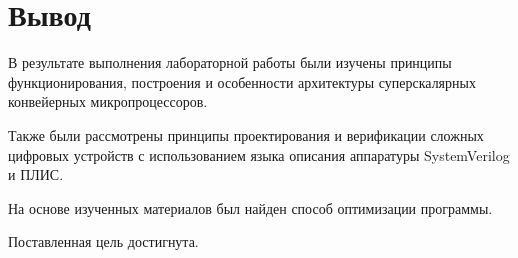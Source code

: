 \chapter*{Вывод}

В результате выполнения лабораторной работы были изучены принципы функционирования, построения и особенности архитектуры суперскалярных конвейерных микропроцессоров.

Также были рассмотрены принципы проектирования и верификации сложных цифровых устройств с использованием языка описания аппаратуры SystemVerilog и ПЛИС.

На основе изученных материалов был найден способ оптимизации программы.

Поставленная цель достигнута.
